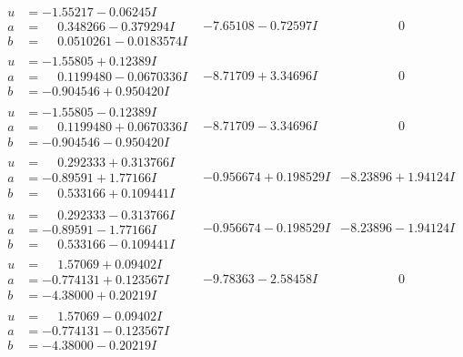 \documentclass[1p]{elsarticle_modified}
\theoremstyle{definition}
\begin{document}
$$\begin{array}{c|c|c}
 \hline 
\begin{aligned}
u &= -1.55217 - 0.06245 I \\
a &= \phantom{-}0.348266 - 0.379294 I \\
b &= \phantom{-}0.0510261 - 0.0183574 I\end{aligned}
 & -7.65108 - 0.72597 I & \phantom{-0.000000 } 0 \\ \hline\begin{aligned}
u &= -1.55805 + 0.12389 I \\
a &= \phantom{-}0.1199480 - 0.0670336 I \\
b &= -0.904546 + 0.950420 I\end{aligned}
 & -8.71709 + 3.34696 I & \phantom{-0.000000 } 0 \\ \hline\begin{aligned}
u &= -1.55805 - 0.12389 I \\
a &= \phantom{-}0.1199480 + 0.0670336 I \\
b &= -0.904546 - 0.950420 I\end{aligned}
 & -8.71709 - 3.34696 I & \phantom{-0.000000 } 0 \\ \hline\begin{aligned}
u &= \phantom{-}0.292333 + 0.313766 I \\
a &= -0.89591 + 1.77166 I \\
b &= \phantom{-}0.533166 + 0.109441 I\end{aligned}
 & -0.956674 + 0.198529 I & -8.23896 + 1.94124 I \\ \hline\begin{aligned}
u &= \phantom{-}0.292333 - 0.313766 I \\
a &= -0.89591 - 1.77166 I \\
b &= \phantom{-}0.533166 - 0.109441 I\end{aligned}
 & -0.956674 - 0.198529 I & -8.23896 - 1.94124 I \\ \hline\begin{aligned}
u &= \phantom{-}1.57069 + 0.09402 I \\
a &= -0.774131 + 0.123567 I \\
b &= -4.38000 + 0.20219 I\end{aligned}
 & -9.78363 - 2.58458 I & \phantom{-0.000000 } 0 \\ \hline\begin{aligned}
u &= \phantom{-}1.57069 - 0.09402 I \\
a &= -0.774131 - 0.123567 I \\
b &= -4.38000 - 0.20219 I\end{aligned}

\end{array}$$
\end{document}
